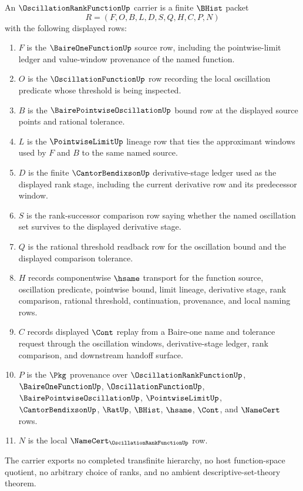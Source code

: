 \begin{definition}
\label{def:oscillation-rank-function-carrier}
An $\OscillationRankFunctionUp$ carrier is a finite $\BHist$ packet
$$
R=(F,O,B,L,D,S,Q,H,C,P,N)
$$
with the following displayed rows:
\begin{enumerate}
\item $F$ is the $\BaireOneFunctionUp$ source row, including the pointwise-limit ledger and value-window provenance of the named function.
\item $O$ is the $\OscillationFunctionUp$ row recording the local oscillation predicate whose threshold is being inspected.
\item $B$ is the $\BairePointwiseOscillationUp$ bound row at the displayed source points and rational tolerance.
\item $L$ is the $\PointwiseLimitUp$ lineage row that ties the approximant windows used by $F$ and $B$ to the same named source.
\item $D$ is the finite $\CantorBendixsonUp$ derivative-stage ledger used as the displayed rank stage, including the current derivative row and its predecessor window.
\item $S$ is the rank-successor comparison row saying whether the named oscillation set survives to the displayed derivative stage.
\item $Q$ is the rational threshold readback row for the oscillation bound and the displayed comparison tolerance.
\item $H$ records componentwise $\hsame$ transport for the function source, oscillation predicate, pointwise bound, limit lineage, derivative stage, rank comparison, rational threshold, continuation, provenance, and local naming rows.
\item $C$ records displayed $\Cont$ replay from a Baire-one name and tolerance request through the oscillation windows, derivative-stage ledger, rank comparison, and downstream handoff surface.
\item $P$ is the $\Pkg$ provenance over $\OscillationRankFunctionUp$, $\BaireOneFunctionUp$, $\OscillationFunctionUp$, $\BairePointwiseOscillationUp$, $\PointwiseLimitUp$, $\CantorBendixsonUp$, $\RatUp$, $\BHist$, $\hsame$, $\Cont$, and $\NameCert$ rows.
\item $N$ is the local $\NameCert_{\OscillationRankFunctionUp}$ row.
\end{enumerate}
The carrier exports no completed transfinite hierarchy, no host function-space quotient, no arbitrary choice of ranks, and no ambient descriptive-set-theory theorem.
\end{definition}

